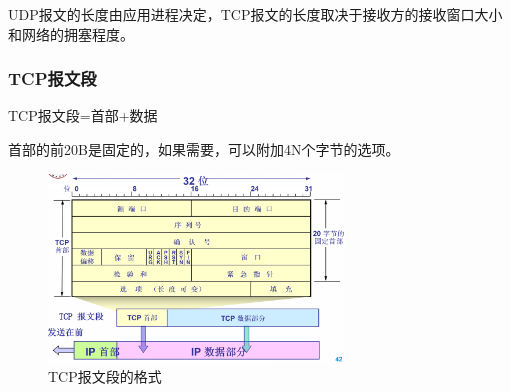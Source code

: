 \documentclass[12pt, a4paper, oneside]{ctexart}
\begin{document}
UDP报文的长度由应用进程决定，TCP报文的长度取决于接收方的接收窗口大小和网络的拥塞程度。

\subsubsection{TCP报文段}

TCP报文段=首部+数据

首部的前20B是固定的，如果需要，可以附加4N个字节的选项。

\begin{figure}[h]
    \centering
    \includegraphics[width=0.7\textwidth]{./images/tcp_segment.png}
    \caption{TCP报文段的格式}
\end{figure}
\end{document}
